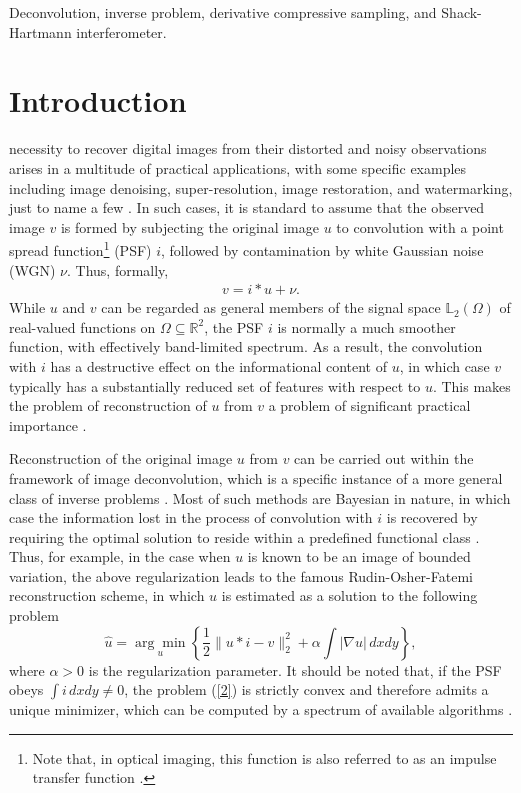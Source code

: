 \pdfoutput=1 \documentclass[journal]{IEEEtran}
\begin{document}
\begin{IEEEkeywords}
Deconvolution, inverse problem, derivative compressive sampling, and Shack-Hartmann interferometer.
\end{IEEEkeywords}

\IEEEpeerreviewmaketitle

\section{Introduction}
 necessity to recover digital images from their distorted and noisy observations arises in a multitude of practical applications, with some specific examples including image denoising, super-resolution, image restoration, and watermarking, just to name a few \cite{30, 28, 29, 40}. In such cases, it is standard to assume that the observed image $v$ is formed by subjecting the original image $u$ to convolution with a point spread function\footnote{Note that, in optical imaging, this function is also referred to as an impulse transfer function \cite{39}.} (PSF) $i$, followed by contamination by white Gaussian noise (WGN) $\nu$. Thus, formally,
\begin{equation}\label{1}
\begin{split}
v=i \ast u + \nu.
\end{split}
\end{equation}
While $u$ and $v$ can be regarded as general members of the signal space $\mathbb{L}_2(\Omega)$ of real-valued functions on $\Omega \subseteq \mathbb{R}^2$, the PSF $i$ is normally a much smoother function, with effectively band-limited spectrum. As a result, the convolution with $i$ has a destructive effect on the informational content of $u$, in which case $v$ typically has a substantially reduced set of features with respect to $u$. This makes the problem of reconstruction of $u$ from $v$ a problem of significant practical importance \cite{41}.

Reconstruction of the original image $u$ from $v$ can be carried out within the framework of image deconvolution, which is a specific instance of a more general class of inverse problems \cite{42}. Most of such methods are Bayesian in nature, in which case the information lost in the process of convolution with $i$ is recovered by requiring the optimal solution to reside within a predefined functional class \cite{26, 27}. Thus, for example, in the case when $u$ is known to be an image of bounded variation, the above regularization leads to the famous Rudin-Osher-Fatemi reconstruction scheme, in which $u$ is estimated as a solution to the following problem \cite{0, 11}
\begin{equation} \label{2}
\hat{u} = \underset{u}{\arg\min} \left\{ \frac{1}{2} \| u \ast i - v \|_2^2 + \alpha \int |\nabla u| \, dx dy \right\},
\end{equation}
where $\alpha>0$ is the regularization parameter. It should be noted that, if the PSF obeys $\int i \, dx dy \neq 0$, the problem (\ref{2}) is strictly convex and therefore admits a unique minimizer, which can be computed by a spectrum of available algorithms \cite{0, 11}.
\end{document}
